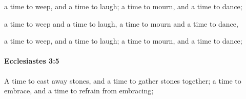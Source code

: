 			\begin{versebox}
					\item[BHS] 
					\item[LXX] 
					\item[ASV] a time to weep, and a time to laugh; a time to mourn, and a time to dance;
					\item[NIV] a time to weep and a time to laugh, a time to mourn and a time to dance,
					\item[NRSV] a time to weep, and a time to laugh; a time to mourn, and a time to dance;
			\end{versebox}

		\paragraph{Ecclesiastes 3:5} %
			\label{ECCLESIASTES-3-5}

			A time to cast away stones, and a time to gather stones together; a time to embrace, and a time to refrain from embracing;

